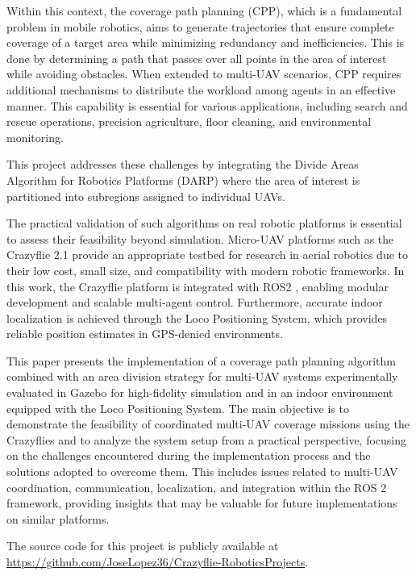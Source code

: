 \documentclass[conference]{IEEEtran}
\begin{document}
Within this context, the coverage path planning (CPP), which is a fundamental problem in mobile robotics, aims to generate trajectories that ensure complete coverage of a target area while minimizing redundancy and inefficiencies. This is done by determining a path that passes over all points in the area of interest while avoiding obstacles. When extended to multi-UAV scenarios, CPP requires additional mechanisms to distribute the workload among agents in an effective manner. This capability is essential for various applications, including search and rescue operations, precision agriculture, floor cleaning, and environmental monitoring.

This project addresses these challenges by integrating the Divide Areas Algorithm for Robotics Platforms (DARP) \cite{Kapoutsis} where the area of interest is partitioned into subregions assigned to individual UAVs. 

The practical validation of such algorithms on real robotic platforms is essential to assess their feasibility beyond simulation. Micro-UAV platforms such as the Crazyflie 2.1 \cite{8046794} provide an appropriate testbed for research in aerial robotics due to their low cost, small size, and compatibility with modern robotic frameworks. In this work, the Crazyflie platform is integrated with ROS2 \cite{macenski2022ros2}, enabling modular development and scalable multi-agent control. Furthermore, accurate indoor localization is achieved through the Loco Positioning System, which provides reliable position estimates in GPS-denied environments.

This paper presents the implementation of a coverage path planning algorithm combined with an area division strategy for multi-UAV systems experimentally evaluated in Gazebo \cite{koenig2004gazebo} for high-fidelity simulation and in an indoor environment equipped with the Loco Positioning System. The main objective is to demonstrate the feasibility of coordinated multi-UAV coverage missions using the Crazyflies and to analyze the system setup from a practical perspective, focusing on the challenges encountered during the implementation process and the solutions adopted to overcome them. This includes issues related to multi-UAV coordination, communication, localization, and integration within the ROS 2 framework, providing insights that may be valuable for future implementations on similar platforms. 

The source code for this project is publicly available at \url{https://github.com/JoseLopez36/Crazyflie-RoboticsProjects}.
\end{document}

